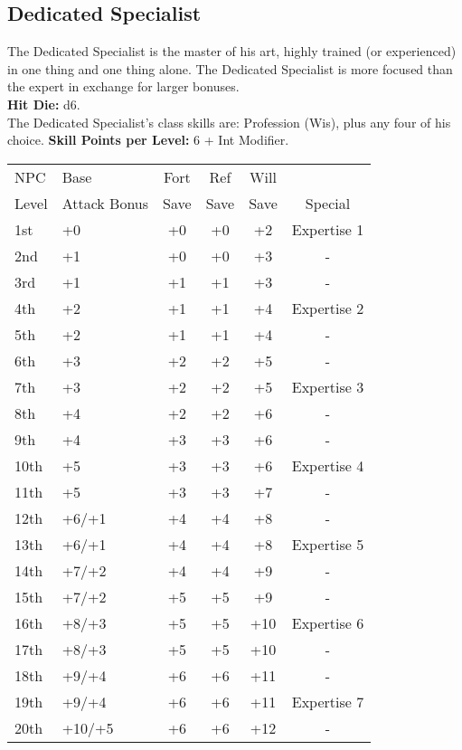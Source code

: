 \documentclass[11pt]{report}
\begin{document}
\subsection{Dedicated Specialist}
The Dedicated Specialist is the master of his art, highly trained (or
experienced) in one thing and one thing alone. The Dedicated Specialist is more
focused than the expert in exchange for larger bonuses. \\
\textbf{Hit Die:} d6. \\
The Dedicated Specialist's class skills are: Profession (Wis), plus any four of
his choice.
\textbf{Skill Points per Level:} 6 + Int Modifier.

\begin{tabular}{llcccc}
\hline
NPC & Base & Fort & Ref & Will & \\
Level & Attack Bonus & Save & Save & Save & Special \\
\hline

	1st & +0 & +0 & +0 & +2 & Expertise 1 \\
\tblbg	2nd & +1 & +0 & +0 & +3 & - \\
	3rd & +1 & +1 & +1 & +3 & - \\
\tblbg	4th & +2 & +1 & +1 & +4 & Expertise 2 \\
	5th & +2 & +1 & +1 & +4 & - \\
\tblbg	6th & +3 & +2 & +2 & +5 & - \\
	7th & +3 & +2 & +2 & +5 & Expertise 3 \\
\tblbg	8th & +4 & +2 & +2 & +6 & - \\
	9th & +4 & +3 & +3 & +6 & - \\
\tblbg	10th & +5 & +3 & +3 & +6 & Expertise 4 \\
	11th & +5 & +3 & +3 & +7 & - \\
\tblbg	12th & +6/+1 & +4 & +4 & +8 & - \\
	13th & +6/+1 & +4 & +4 & +8 & Expertise 5 \\
\tblbg	14th & +7/+2 & +4 & +4 & +9 & - \\
	15th & +7/+2 & +5 & +5 & +9 & - \\
\tblbg	16th & +8/+3 & +5 & +5 & +10 & Expertise 6 \\
	17th & +8/+3 & +5 & +5 & +10 & - \\
\tblbg	18th & +9/+4 & +6 & +6 & +11 & - \\
	19th & +9/+4 & +6 & +6 & +11 & Expertise 7 \\
\tblbg	20th & +10/+5 & +6 & +6 & +12 & - \\
\hline
\end{tabular}
\end{document}

